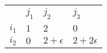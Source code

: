 \begin{center}
    \begin{tabular}{llll}
    \                           & $j_1$    & $j_2$                      & $j_3$                           \\ \cline{2-4}
    \multicolumn{1}{l|}{$i_1$} & $1$ & $2$          & \multicolumn{1}{l|}{$0$} \\
    \multicolumn{1}{l|}{$i_2$} & $0$ & $2+\epsilon$ & \multicolumn{1}{l|}{$2+2\epsilon$} \\ \cline{2-4}
    \end{tabular}
\end{center}